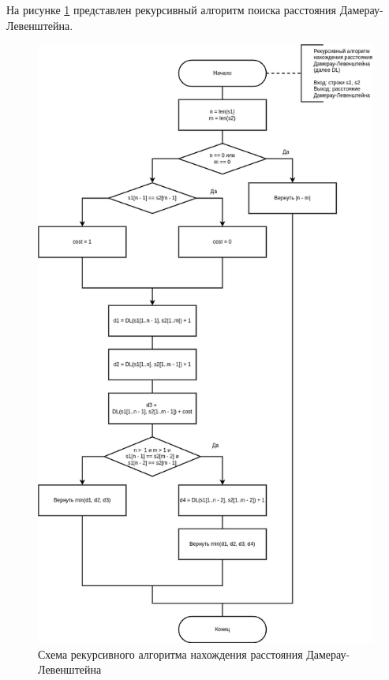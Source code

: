 На рисунке \ref{img:dl_recursive} представлен рекурсивный алгоритм поиска расстояния Дамерау-Левенштейна.

\begin{figure}[H]
	\begin{center}
		\includegraphics[scale=0.45]{img/dl_recursive.png}
	\end{center}
	\captionsetup{justification=centering}
	\caption{Схема рекурсивного алгоритма нахождения расстояния Дамерау-Левенштейна}
	\label{img:dl_recursive}
\end{figure}

